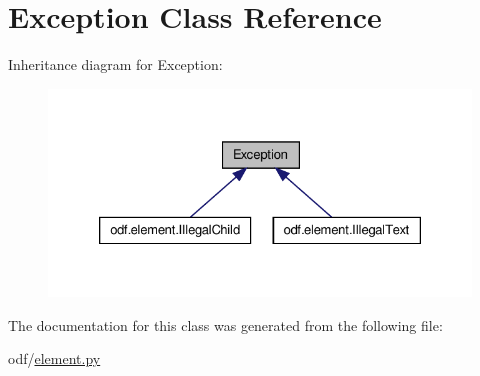 \hypertarget{classException}{\section{Exception Class Reference}
\label{classException}
}


Inheritance diagram for Exception\+:
\nopagebreak
\begin{figure}[H]
\begin{center}
\leavevmode
\includegraphics[width=326pt]{classException__inherit__graph}
\end{center}
\end{figure}


The documentation for this class was generated from the following file\+:\begin{DoxyCompactItemize}
\item 
odf/\hyperlink{element_8py}{element.\+py}\end{DoxyCompactItemize}

